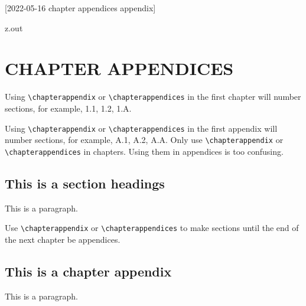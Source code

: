 [2022-05-16 chapter appendices appendix]

\begin{VerbatimOut}{z.out}
\chapter{CHAPTER APPENDICES}

Using \verb+\chapterappendix+ or \verb+\chapterappendices+
in the first chapter will number sections, for example,
1.1, 1.2, 1.A.

Using \verb+\chapterappendix+ or \verb+\chapterappendices+
in the first appendix will number sections, for example,
A.1, A.2, A.A.
Only use \verb+\chapterappendix+ or \verb+\chapterappendices+
in chapters.
Using them in appendices is too confusing.

\section{This is a section headings}

This is a paragraph.

Use \verb+\chapterappendix+ or \verb+\chapterappendices+
to make sections until the end of the next chapter
be appendices.

\chapterappendix

\section{This is a chapter appendix}

This is a paragraph.
\end{VerbatimOut}

\MyIO
